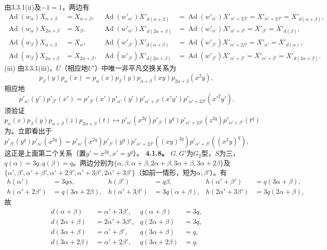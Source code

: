 由3.3.1(ii)及$-1=1$，两边有
\[\begin{aligned}\operatorname{Ad}(w_\alpha)X_{\alpha+\beta}&=X_{\alpha+\beta},&\operatorname{Ad}(w'_{\alpha'})X'_{d(\alpha+\beta)}&=\operatorname{Ad}(w'_{\alpha'})X'_{\alpha'+2\beta'}=X'_{\alpha'+2\beta'}=X'_{d(\alpha+\beta)},\\\operatorname{Ad}(w_\alpha)X_{2\alpha+\beta}&=X_\beta,&\operatorname{Ad}(w'_{\alpha'})X'_{d(2\alpha+\beta)}&=\operatorname{Ad}(w'_{\alpha'})X'_{\alpha'+\beta'}=X'_{\beta'}=X'_{d(\beta)},\\\operatorname{Ad}(w_\beta)X_{\alpha+\beta}&=X_\alpha,&\operatorname{Ad}(w'_{\beta'})X'_{d(\alpha+\beta)}&=\operatorname{Ad}(w'_{\beta'})X'_{\alpha'+2\beta'}=X'_{\alpha'}=X'_{d(\alpha)},\\\operatorname{Ad}(w_\beta)X_{2\alpha+\beta}&=X_{2\alpha+\beta},&\operatorname{Ad}(w'_{\beta'})X'_{d(2\alpha+\beta)}&=\operatorname{Ad}(w'_{\beta'})X'_{\alpha'+\beta'}=X'_{\alpha'+\beta'}=X'_{d(2\alpha+\beta)}.\end{aligned}\]
(iii) 由3.3.1(iii)，$U$（相应地$U'$）中唯一非平凡交换关系为
\[p_\beta(y)p_\alpha(x)=p_\alpha(x)p_\beta(y)p_{\alpha+\beta}(xy)p_{2\alpha+\beta}(x^2y),\]
相应地
\[p'_{\alpha'}(y')p'_{\beta'}(x')=p'_{\beta'}(x')p'_{\alpha'}(y')p'_{\alpha'+\beta'}(x'y')p'_{\alpha'+2\beta'}(x'^2y').\]
须验证
\[p_\alpha(x)p_\beta(y)p_{\alpha+\beta}(z)p_{2\alpha+\beta}(t)\longmapsto p'_{\alpha'}(x^{2q})p'_{\beta'}(y^q)p'_{\alpha'+2\beta'}(z^{2q})p'_{\alpha'+\beta'}(t^q)\]
为。立即看出于
\[p'_{\beta'}(y^q)p'_{\alpha'}(x^{2q})=p'_{\alpha'}(x^{2q})p'_{\beta'}(y^q)p'_{\alpha'+2\beta'}((xy)^{2q})p'_{\alpha'+\beta'}((x^2y)^q),\]
这正是上面第二个关系（置$y'=x^{2q},x'=y^q$）。
\textbf{4.1.8。} $G,G'$为$G_2$型，$S$为三，$q(\alpha)=3q,q(\beta)=q$。两边分别为$\{\alpha,\beta,\alpha+\beta,2\alpha+\beta,3\alpha+\beta,3\alpha+2\beta\}$及$\{\alpha',\beta',\alpha'+\beta',\alpha'+2\beta',\alpha'+3\beta',2\alpha'+3\beta'\}$（如前一情形，短为$\alpha,\beta'$）。有
\[\begin{aligned}h(\alpha')&=3q\alpha,&h(\beta')&=q\beta,&h(\alpha'+\beta')&=q(3\alpha+\beta),\\h(\alpha'+2\beta')&=q(3\alpha+2\beta),&h(\alpha'+3\beta')&=3q(\alpha+\beta),&h(2\alpha'+3\beta')&=3q(2\alpha+\beta),\end{aligned}\]
故
\[\begin{aligned}d(\alpha+\beta)&=\alpha'+3\beta',&q(\alpha+\beta)&=3q,\\d(2\alpha+\beta)&=2\alpha'+3\beta',&q(2\alpha+\beta)&=3q,\\d(3\alpha+\beta)&=\alpha'+\beta',&q(3\alpha+\beta)&=q,\\d(3\alpha+2\beta)&=\alpha'+2\beta',&q(3\alpha+2\beta)&=q.\end{aligned}\]
